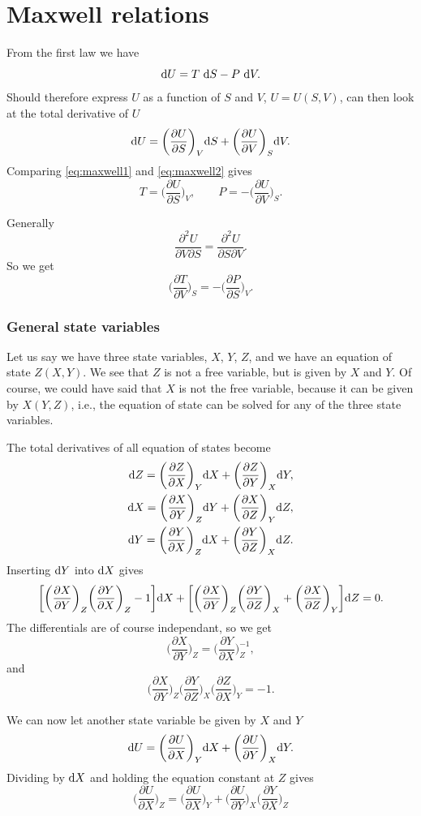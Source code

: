 \documentclass[a4paper, 11pt, notitlepage, english]{article}
\newcommand{\beq}{\begin{equation}}
\newcommand{\eeq}{\end{equation}}
\renewcommand{\d}{{\rm d}}
\renewcommand{\b}{\bigg}
\newcommand{\p}{\partial}
\begin{document}
\section*{Maxwell relations}
From the first law we have
\beq \d U = T\ \d S - P\ \d V. \eeq \label{eq:maxwell1}
Should therefore express $U$ as a function of $S$ and $V$, $U = U(S,V)$, can then look at the total derivative of $U$
\beq \d U = \bigg(\frac{\p U}{\p S}\bigg)_V \d S + \bigg(\frac{\p U}{\p V}\bigg)_S \d V. \eeq \label{eq:maxwell2}
Comparing \ref{eq:maxwell1} and \ref{eq:maxwell2} gives
$$T = \bigg(\frac{\p U}{\p S}\bigg)_V, \qquad P = -\bigg(\frac{\p U}{\p V}\bigg)_S.$$

Generally
$$\frac{\p^2 U}{\p V \p S} = \frac{\p^2 U}{\p S \p V}.$$
So we get
$$\bigg(\frac{\p T}{\p V}\bigg)_S = -\bigg(\frac{\p P}{\p S}\bigg)_V.$$

\subsubsection*{General state variables}
Let us say we have three state variables, $X$, $Y$, $Z$, and we have an equation of state $Z(X,Y)$. We see that $Z$ is not a free variable, but is given by $X$ and $Y$. Of course, we could have said that $X$ is not the free variable, because it can be given by $X(Y,Z)$, i.e., the equation of state can be solved for any of the three state variables.

The total derivatives of all equation of states become
\begin{align*}
\d Z = \bigg(\frac{\p Z}{\p X}\bigg)_Y \d X + \bigg(\frac{\p Z}{\p Y}\bigg)_X \d Y, \\
\d X = \bigg(\frac{\p X}{\p Y}\bigg)_Z \d Y + \bigg(\frac{\p X}{\p Z}\bigg)_Y \d Z, \\
\d Y = \bigg(\frac{\p Y}{\p X}\bigg)_Z \d X + \bigg(\frac{\p Y}{\p Z}\bigg)_X \d Z.
\end{align*}
Inserting $\d Y$ into $\d X$ gives
$$\bigg[\bigg(\frac{\p X}{\p Y}\bigg)_Z\bigg(\frac{\p Y}{\p X}\bigg)_Z - 1\bigg]\d X  + \bigg[\bigg(\frac{\p X}{\p Y}\bigg)_Z\bigg(\frac{\p Y}{\p Z}\bigg)_X + \bigg(\frac{\p X}{\p Z}\bigg)_Y\bigg]\d Z = 0.$$
The differentials are of course independant, so we get
$$\bigg(\frac{\p X}{\p Y}\bigg)_Z = \bigg(\frac{\p Y}{\p X}\bigg)_Z^{-1},$$
and
$$\bigg(\frac{\p X}{\p Y}\bigg)_Z \bigg(\frac{\p Y}{\p Z}\bigg)_X \bigg(\frac{\p Z}{\p X}\bigg)_Y = -1.$$

We can now let another state variable be given by $X$ and $Y$
$$\d U = \bigg(\frac{\p U}{\p X}\bigg)_Y \d X + \bigg(\frac{\p U}{\p Y}\bigg)_X \d Y.$$
Dividing by $\d X$ and holding the equation constant at $Z$ gives
$$\b( \frac{\p U}{\p X} \b)_Z = \bigg(\frac{\p U}{\p X}\b)_Y + \b(\frac{\p U}{\p Y}\b)_X \b(\frac{\p Y}{\p X}\b)_Z$$
\end{document}

